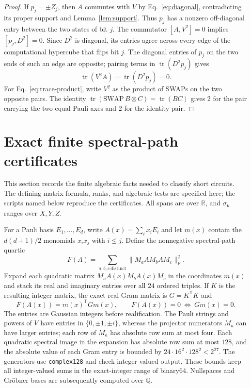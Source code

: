 \documentclass[11pt]{article}
\newcommand{\tr}{\operatorname{tr}}
\newcommand{\Frob}{\mathrm F}
\begin{document}
\begin{proof}
If $p_j=\pm Z_j$, then $A$ commutes with $V$ by
Eq.~\eqref{eq:diagonal}, contradicting its proper support and
Lemma~\ref{lem:support}.  Thus $p_j$ has a nonzero off-diagonal entry
between the two states of bit $j$.  The commutator $[A,V^2]=0$ implies
$[p_j,D^2]=0$.  Since $D^2$ is diagonal, its entries agree across every
edge of the computational hypercube that flips bit $j$.  The diagonal
entries of $p_j$ on the two ends of such an edge are opposite; pairing
terms in $\tr(D^2p_j)$ gives
\begin{equation}\label{eq:trace-zero}
\tr(V^2A)=\tr(D^2p_j)=0.
\end{equation}
For Eq.~\eqref{eq:trace-product}, write $V^2$ as the product of SWAPs
on the two opposite pairs.  The identity
$\tr(\mathrm{SWAP}\, B\otimes C)=\tr(BC)$ gives $2$ for the pair
carrying the two equal Pauli axes and $2$ for the identity pair.
\end{proof}

\section{Exact finite spectral-path certificates}

This section records the finite algebraic facts needed to classify short
circuits.  The defining matrix formula, ranks, and algebraic tests are
specified here; the scripts named below reproduce the certificates.
All spans are over $\mathbb R$, and $\sigma_\mu$ ranges over $X,Y,Z$.

For a Pauli basis $E_1,\ldots,E_d$, write
$A(x)=\sum_i x_iE_i$ and let $m(x)$ contain the
$d(d+1)/2$ monomials $x_ix_j$ with $i\leq j$.  Define the nonnegative
spectral-path quartic
\begin{equation}\label{eq:quartic}
F(A)=\sum_{a,b,c\ \mathrm{distinct}}
 \bigl\|M_aAM_bAM_c\bigr\|_{\Frob}^{2}.
\end{equation}
Expand each quadratic matrix $M_aA(x)M_bA(x)M_c$ in the coordinates
$m(x)$ and stack its real and imaginary entries over all $24$ ordered
triples.  If $K$ is the resulting integer matrix, the exact real Gram
matrix is $G=K^{\mathsf T}K$ and
\begin{equation}\label{eq:gram}
F(A(x))=m(x)^{\mathsf T}Gm(x),\qquad
F(A(x))=0\ \Longleftrightarrow\ Gm(x)=0.
\end{equation}
The entries are Gaussian integers before realification.  The Pauli
strings and powers of $V$ have entries in $\{0,\pm1,\pm i\}$, whereas
the projector numerators $M_a$ can have larger entries; each row of
$M_a$ has absolute row sum at most four.  Each quadratic spectral image
in the expansion has absolute row sum at most $128$, and the absolute
value of each Gram entry is bounded by
$24\cdot16^2\cdot128^2<2^{27}$.  The generators use
\texttt{complex128} and check integer-valued output.  These bounds keep
all integer-valued sums in the exact-integer range of binary64.
Nullspaces and Gr\"obner bases are subsequently computed over $\mathbb Q$.
\end{document}
